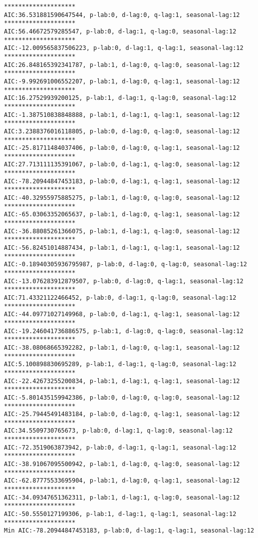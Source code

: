 \documentclass[11pt]{article}
\begin{document}
    \begin{Verbatim}[commandchars=\\\{\}]
********************
AIC:36.531881590647544, p-lab:0, d-lag:0, q-lag:1, seasonal-lag:12
********************
AIC:56.46672579285547, p-lab:0, d-lag:1, q-lag:0, seasonal-lag:12
********************
AIC:-12.009565837506223, p-lab:0, d-lag:1, q-lag:1, seasonal-lag:12
********************
AIC:26.848165392341787, p-lab:1, d-lag:0, q-lag:0, seasonal-lag:12
********************
AIC:-9.992691006552207, p-lab:1, d-lag:0, q-lag:1, seasonal-lag:12
********************
AIC:16.27529939200125, p-lab:1, d-lag:1, q-lag:0, seasonal-lag:12
********************
AIC:-1.387510838848888, p-lab:1, d-lag:1, q-lag:1, seasonal-lag:12
********************
AIC:3.2388376016118805, p-lab:0, d-lag:0, q-lag:0, seasonal-lag:12
********************
AIC:-25.81711484037406, p-lab:0, d-lag:0, q-lag:1, seasonal-lag:12
********************
AIC:27.713111135391067, p-lab:0, d-lag:1, q-lag:0, seasonal-lag:12
********************
AIC:-78.20944847453183, p-lab:0, d-lag:1, q-lag:1, seasonal-lag:12
********************
AIC:-40.32955975885275, p-lab:1, d-lag:0, q-lag:0, seasonal-lag:12
********************
AIC:-65.03063352065637, p-lab:1, d-lag:0, q-lag:1, seasonal-lag:12
********************
AIC:-36.88085261366075, p-lab:1, d-lag:1, q-lag:0, seasonal-lag:12
********************
AIC:-56.82451014887434, p-lab:1, d-lag:1, q-lag:1, seasonal-lag:12
********************
AIC:-0.18940305936795987, p-lab:0, d-lag:0, q-lag:0, seasonal-lag:12
********************
AIC:-13.076283912879507, p-lab:0, d-lag:0, q-lag:1, seasonal-lag:12
********************
AIC:71.43321122466452, p-lab:0, d-lag:1, q-lag:0, seasonal-lag:12
********************
AIC:-44.09771027149968, p-lab:0, d-lag:1, q-lag:1, seasonal-lag:12
********************
AIC:-19.246041736886575, p-lab:1, d-lag:0, q-lag:0, seasonal-lag:12
********************
AIC:-38.08068665392282, p-lab:1, d-lag:0, q-lag:1, seasonal-lag:12
********************
AIC:5.100898830695289, p-lab:1, d-lag:1, q-lag:0, seasonal-lag:12
********************
AIC:-22.42673255200834, p-lab:1, d-lag:1, q-lag:1, seasonal-lag:12
********************
AIC:-5.801435159942386, p-lab:0, d-lag:0, q-lag:0, seasonal-lag:12
********************
AIC:-25.79445491483184, p-lab:0, d-lag:0, q-lag:1, seasonal-lag:12
********************
AIC:34.5509730765673, p-lab:0, d-lag:1, q-lag:0, seasonal-lag:12
********************
AIC:-72.3519063873942, p-lab:0, d-lag:1, q-lag:1, seasonal-lag:12
********************
AIC:-38.91067095500942, p-lab:1, d-lag:0, q-lag:0, seasonal-lag:12
********************
AIC:-62.87775533695904, p-lab:1, d-lag:0, q-lag:1, seasonal-lag:12
********************
AIC:-34.09347651362311, p-lab:1, d-lag:1, q-lag:0, seasonal-lag:12
********************
AIC:-50.5550127199306, p-lab:1, d-lag:1, q-lag:1, seasonal-lag:12
********************
Min AIC:-78.20944847453183, p-lab:0, d-lag:1, q-lag:1, seasonal-lag:12

    \end{Verbatim}
\end{document}
